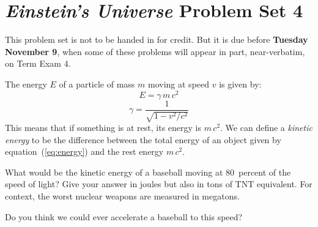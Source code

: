 \documentclass[12pt, letterpaper]{article}
\begin{document}
\section*{\textsl{Einstein's Universe} Problem Set 4}

This problem set is not to be handed in for credit. But it is due
before \textbf{Tuesday November 9}, when some of these problems
will appear in part, near-verbatim, on Term Exam 4.

\begin{problem}
The energy $E$ of a particle of mass $m$ moving
at speed $v$ is given by:
\begin{equation}\label{eq:energy}
E = \gamma\,m\,c^2
\end{equation}
\begin{equation}
\gamma = \frac{1}{\sqrt{1 - v^2/c^2}}
\end{equation}
This means that if something is at rest, its energy is $m\,c^2$.
We can define a \emph{kinetic energy} to be the difference
between the total energy of an object given by
equation~(\ref{eq:energy}) and the rest energy $m\,c^2$.

What would be the kinetic energy of a baseball moving at 80~percent of the
speed of light? Give your answer in joules but also in tons of TNT
equivalent. For context, the worst nuclear weapons are measured in
megatons.

Do you think we could ever accelerate a baseball to this speed?
\end{problem}

\end{document}

